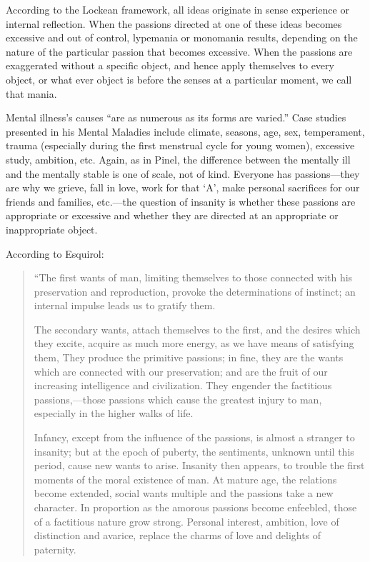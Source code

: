 \begin{refsection}
According to the Lockean framework, all ideas originate in sense experience or internal reflection. When the passions directed at one of these ideas becomes excessive and out of control, lypemania or monomania results, depending on the nature of the particular passion that becomes excessive. When the passions are exaggerated without a specific object, and hence apply themselves to every object, or what ever object is before the senses at a particular moment, we call that mania.

Mental illness's causes “are as numerous as its forms are varied.” Case studies presented in his Mental Maladies include climate, seasons, age, sex, temperament, trauma (especially during the first menstrual cycle for young women), excessive study, ambition, etc. Again, as in Pinel, the difference between the mentally ill and the mentally stable is one of scale, not of kind. Everyone has passions---they are why we grieve, fall in love, work for that `A', make personal sacrifices for our friends and families, etc.---the question of insanity is whether these passions are appropriate or excessive and whether they are directed at an appropriate or inappropriate object.

According to Esquirol:

\begin{quote}

“The first wants of man, limiting themselves to those connected with his preservation and reproduction, provoke the determinations of instinct; an internal impulse leads us to gratify them.

The secondary wants, attach themselves to the first, and the desires which they excite, acquire as much more energy, as we have means of satisfying them, They produce the primitive passions; in fine, they are the wants which are connected with our preservation; and are the fruit of our increasing intelligence and civilization. They engender the factitious passions,—those passions which cause the greatest injury to man, especially in the higher walks of life.

Infancy, except from the influence of the passions, is almost a stranger to insanity; but at the epoch of puberty, the sentiments, unknown until this period, cause new wants to arise. Insanity then appears, to trouble the first moments of the moral existence of man.
At mature age, the relations become extended, social wants multiple and the passions take a new character. In proportion as the amorous passions become enfeebled, those of a factitious nature grow strong. Personal interest, ambition, love of distinction and avarice, replace the charms of love and delights of paternity.


\end{quote}
\end{refsection}
